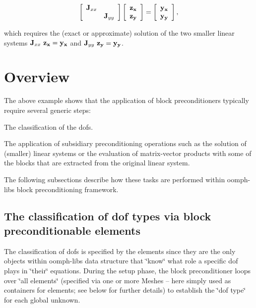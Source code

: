 \[ \left[ \begin{array}{cc} {\bf J}_{xx}& \\ &{\bf J}_{yy} \end{array} \right] \left[ \begin{array}{c} {\bf z_x}\\ \bf z_y\\ \end{array} \right] = \left[ \begin{array}{c} \bf y_x\\ \bf y_y \end{array} \right], \]

which requires the (exact or approximate) solution of the two smaller linear systems $ {\bf J}_{xx} \ {\bf z_x} = {\bf y_x}$ and $ {\bf J}_{yy} \ {\bf z_y} = {\bf y_y}$.\hypertarget{index_generic_implementation}{}\section{Overview}\label{index_generic_implementation}
The above example shows that the application of block preconditioners typically require several generic steps\+:


\begin{DoxyEnumerate}
\item The classification of the dofs.
\item The application of subsidiary preconditioning operations such as the solution of (smaller) linear systems or the evaluation of matrix-\/vector products with some of the blocks that are extracted from the original linear system.
\end{DoxyEnumerate}

The following subsections describe how these tasks are performed within {\ttfamily oomph-\/lib\textquotesingle{}s} block preconditioning framework.\hypertarget{index_block_preconditionable_elements}{}\subsection{The classification of dof types via block preconditionable elements}\label{index_block_preconditionable_elements}
The classification of dofs is specified by the elements since they are the only objects within {\ttfamily oomph-\/lib\textquotesingle{}s} data structure that \char`\"{}know\char`\"{} what role a specific dof plays in \char`\"{}their\char`\"{} equations. During the setup phase, the block preconditioner loops over \char`\"{}all
elements\char`\"{} (specified via one or more {\ttfamily Meshes} -- here simply used as containers for elements; see below for further details) to establish the \char`\"{}dof type\char`\"{} for each global unknown.

